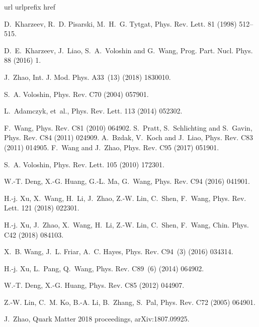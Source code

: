 \documentclass[3p,times,procedia]{elsarticle}
\begin{document}

%
%


\begin{thebibliography}{10}
\expandafter\ifx\csname url\endcsname\relax
  \def\url#1{\texttt{#1}}\fi
\expandafter\ifx\csname urlprefix\endcsname\relax\def\urlprefix{URL }\fi
\expandafter\ifx\csname href\endcsname\relax
  \def\href#1#2{#2} \def\path#1{#1}\fi

D.~Kharzeev, R.~D. Pisarski, M.~H.~G. Tytgat, Phys. Rev. Lett. 81 (1998) 512--515.

D.~E.~Kharzeev, J.~Liao, S.~A.~Voloshin and G.~Wang, Prog. Part. Nucl. Phys.  88 (2016) 1.

J.~Zhao, Int. J. Mod. Phys. A33~(13) (2018) 1830010.

S.~A. Voloshin, Phys. Rev. C70
  (2004) 057901.

L.~Adamczyk, et~al., Phys. Rev. Lett. 113 (2014)
  052302.

F.~Wang, Phys. Rev. C81 (2010) 064902.
S.~Pratt, S.~Schlichting and S.~Gavin, Phys. Rev. C84 (2011) 024909.
A.~Bzdak, V.~Koch and J.~Liao, Phys. Rev. C83 (2011) 014905.
F.~Wang and J.~Zhao, Phys. Rev. C95 (2017) 051901.

S.~A. Voloshin, Phys. Rev. Lett. 105 (2010) 172301.

W.-T. Deng, X.-G. Huang, G.-L. Ma, G.~Wang, Phys. Rev. C94 (2016) 041901.

H.-j. Xu, X.~Wang, H.~Li, J.~Zhao, Z.-W. Lin, C.~Shen, F.~Wang, Phys.
  Rev. Lett. 121 (2018) 022301.

H.-j. Xu, J.~Zhao, X.~Wang, H.~Li, Z.-W. Lin, C.~Shen, F.~Wang, Chin. Phys. C42 (2018) 084103.

X.~B. Wang, J.~L. Friar, A.~C. Hayes, Phys. Rev. C94~(3) (2016) 034314.

H.-j. Xu, L.~Pang, Q.~Wang, Phys. Rev. C89~(6) (2014) 064902.

W.-T. Deng, X.-G. Huang, Phys. Rev. C85 (2012) 044907.

Z.-W. Lin, C.~M. Ko, B.-A. Li, B.~Zhang, S.~Pal, Phys. Rev. C72 (2005) 064901.

J.~Zhao, {Quark Matter 2018 proceedings}, arXiv:1807.09925.

\end{thebibliography}
\end{document}
